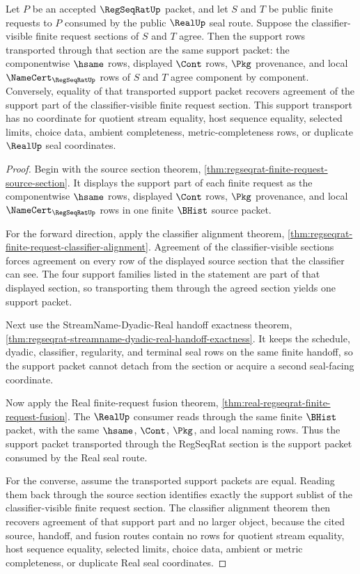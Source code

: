 \begin{theorem}
\label{thm:regseqrat-finite-request-support-transport}
Let $P$ be an accepted $\RegSeqRatUp$ packet, and let $S$ and $T$ be public
finite requests to $P$ consumed by the public $\RealUp$ seal route. Suppose the
classifier-visible finite request sections of $S$ and $T$ agree. Then the
support rows transported through that section are the same support packet:
the componentwise $\hsame$ rows, displayed $\Cont$ rows, $\Pkg$ provenance, and
local $\NameCert_{\RegSeqRatUp}$ rows of $S$ and $T$ agree component by
component. Conversely, equality of that transported support packet recovers
agreement of the support part of the classifier-visible finite request section.
This support transport has no coordinate for quotient stream equality, host
sequence equality, selected limits, choice data, ambient completeness,
metric-completeness rows, or duplicate $\RealUp$ seal coordinates.
\end{theorem}
\begin{proof}
Begin with the source section theorem,
\autoref{thm:regseqrat-finite-request-source-section}. It displays the support
part of each finite request as the componentwise $\hsame$ rows, displayed
$\Cont$ rows, $\Pkg$ provenance, and local $\NameCert_{\RegSeqRatUp}$ rows in
one finite $\BHist$ source packet.

For the forward direction, apply the classifier alignment theorem,
\autoref{thm:regseqrat-finite-request-classifier-alignment}. Agreement of the
classifier-visible sections forces agreement on every row of the displayed
source section that the classifier can see. The four support families listed in
the statement are part of that displayed section, so transporting them through
the agreed section yields one support packet.

Next use the StreamName-Dyadic-Real handoff exactness theorem,
\autoref{thm:regseqrat-streamname-dyadic-real-handoff-exactness}. It keeps the
schedule, dyadic, classifier, regularity, and terminal seal rows on the same
finite handoff, so the support packet cannot detach from the section or acquire
a second seal-facing coordinate.

Now apply the Real finite-request fusion theorem,
\autoref{thm:real-regseqrat-finite-request-fusion}. The $\RealUp$ consumer reads
through the same finite $\BHist$ packet, with the same $\hsame$, $\Cont$,
$\Pkg$, and local naming rows. Thus the support packet transported through the
RegSeqRat section is the support packet consumed by the Real seal route.

For the converse, assume the transported support packets are equal. Reading
them back through the source section identifies exactly the support sublist of
the classifier-visible finite request section. The classifier alignment theorem
then recovers agreement of that support part and no larger object, because the
cited source, handoff, and fusion routes contain no rows for quotient stream
equality, host sequence equality, selected limits, choice data, ambient or
metric completeness, or duplicate Real seal coordinates.
\end{proof}

